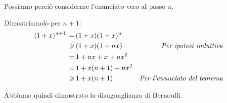 \documentclass[../dimostrazioni]{subfiles}
\begin{document}
            Possiamo perciò considerare l'enunciato vero al passo \(n\).

            \medskip

            Dimostriamolo per \(n + 1\):
            \begin{align*}
                (1 + x)^{n + 1} \, =& \, (1 + x)(1 + x)^n\\
                                \geqslant& \, (1 + x)(1 + nx) & \text{\emph{Per ipotesi induttiva}}\\
                                =& \, 1 + nx + x + nx^2\\
                                =& \, 1 + x (n + 1) + nx^2\\
                                \geqslant& \, 1 + x (n + 1) & \text{\emph{Per l'enunciato del teorema}}
            \end{align*}

            Abbiamo quindi dimostrato la disuguaglianza di Bernoulli.
    
\end{document}
